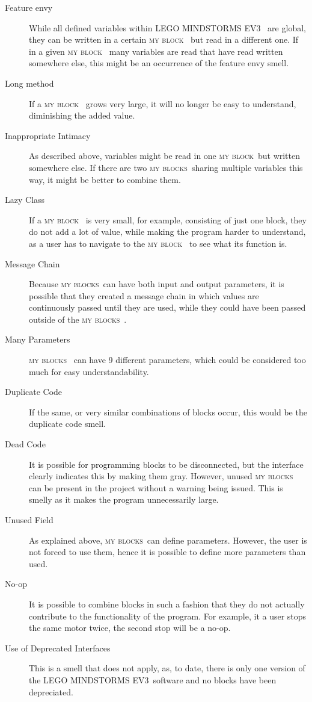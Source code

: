 \documentclass{sig-alternate}
\newcommand{\ms}{LEGO MINDSTORMS EV3}
\newcommand{\mbs}{\textsc{my blocks}}
\newcommand{\mb}{\textsc{my block}}
\begin{document}
\begin{description}
\item[Feature envy] While all defined variables within \ms~ are global, they can be written in a certain \mb~ but read in a different one. If in a given \mb~ many variables are read that have read written somewhere else, this might be an occurrence of the feature envy smell. 
\item[Long method] If a \mb~ grows very large, it will no longer be easy to understand, diminishing the added value.
\item[Inappropriate Intimacy] As described above, variables might be read in one \mb~but written somewhere else. If there are two \mbs~sharing multiple variables this way, it might be better to combine them.
\item[Lazy Class] If a \mb~ is very small, for example, consisting of just one block, they do not add a lot of value, while making the program harder to understand, as a user has to navigate to the \mb~ to see what its function is.
\item[Message Chain] Because \mbs~can have both input and output parameters, it is possible that they created a message chain in which values are continuously passed until they are used, while they could have been passed outside of the \mbs~.
\item[Many Parameters] \mbs~ can have 9 different parameters, which could be considered too much for easy understandability.
\item[Duplicate Code] If the same, or very similar combinations of blocks occur, this would be the duplicate code smell.
\item[Dead Code] It is possible for programming blocks to be disconnected, but the interface clearly indicates this by making them gray. However, unused \mbs~ can be present in the project without a warning being issued. This is smelly as it makes the program unnecessarily large.
\item[Unused Field] As explained above, \mbs~can define parameters. However, the user is not forced to use them, hence it is possible to define more parameters than used.
\item[No-op] It is possible to combine blocks in such a fashion that they do not actually contribute to the functionality of the program. For example, it a user stops the same motor twice, the second stop will be a no-op.
\item[Use of Deprecated Interfaces] This is a smell that does not apply, as, to date, there is only one version of the \ms~software and no blocks have been depreciated.
\end{description}
\end{document}
